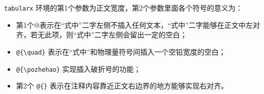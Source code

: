 \texttt{tabularx} 环境的第1个参数为正文宽度，第2个参数里面各个符号的意义为：
\begin{itemize}
\item 第1个@{}表示在“式中”二字左侧不插入任何文本，“式中”二字能够在正文中左对
齐，若无此项，则“式中”二字左侧会留出一定的空白；
\item \verb|@{\quad}| 表示在“式中”和物理量符号间插入一个空铅宽度的空白；
\item \verb|@{\pozhehao}| 实现插入破折号的功能；
\item 第2个 \verb|@{}| 表示在注释内容靠近正文右边界的地方能够实现右对齐。
\end{itemize}





